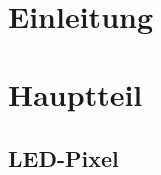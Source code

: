 \begin{figure}
 \\
\end{figure}
\thispagestyle{empty} %
\tableofcontents
\thispagestyle{empty}  
\chapter{Einleitung} 

\chapter{Hauptteil}
\section{LED-Pixel} 
